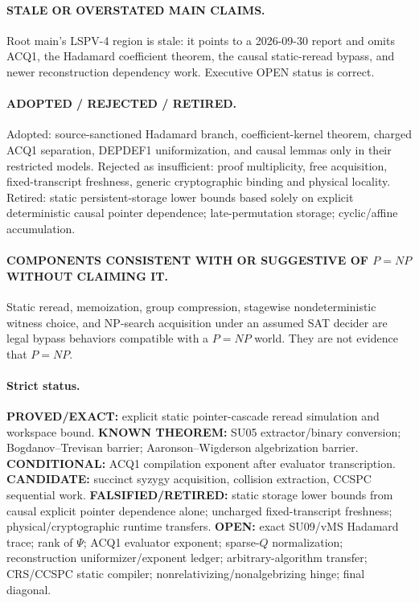 \documentclass[11pt]{article}
\begin{document}
\paragraph{STALE OR OVERSTATED MAIN CLAIMS.} Root main's LSPV-4 region is stale: it points to a 2026-09-30 report and omits ACQ1, the Hadamard coefficient theorem, the causal static-reread bypass, and newer reconstruction dependency work. Executive OPEN status is correct.

\paragraph{ADOPTED / REJECTED / RETIRED.} Adopted: source-sanctioned Hadamard branch, coefficient-kernel theorem, charged ACQ1 separation, DEPDEF1 uniformization, and causal lemmas only in their restricted models. Rejected as insufficient: proof multiplicity, free acquisition, fixed-transcript freshness, generic cryptographic binding and physical locality. Retired: static persistent-storage lower bounds based solely on explicit deterministic causal pointer dependence; late-permutation storage; cyclic/affine accumulation.

\paragraph{COMPONENTS CONSISTENT WITH OR SUGGESTIVE OF $P=NP$ WITHOUT CLAIMING IT.} Static reread, memoization, group compression, stagewise nondeterministic witness choice, and NP-search acquisition under an assumed SAT decider are legal bypass behaviors compatible with a $P=NP$ world. They are not evidence that $P=NP$.

\paragraph{Strict status.} \textbf{PROVED/EXACT:} explicit static pointer-cascade reread simulation and workspace bound. \textbf{KNOWN THEOREM:} SU05 extractor/binary conversion; Bogdanov--Trevisan barrier; Aaronson--Wigderson algebrization barrier. \textbf{CONDITIONAL:} ACQ1 compilation exponent after evaluator transcription. \textbf{CANDIDATE:} succinct syzygy acquisition, collision extraction, CCSPC sequential work. \textbf{FALSIFIED/RETIRED:} static storage lower bounds from causal explicit pointer dependence alone; uncharged fixed-transcript freshness; physical/cryptographic runtime transfers. \textbf{OPEN:} exact SU09/vMS Hadamard trace; rank of $\Psi$; ACQ1 evaluator exponent; sparse-$Q$ normalization; reconstruction uniformizer/exponent ledger; arbitrary-algorithm transfer; CRS/CCSPC static compiler; nonrelativizing/nonalgebrizing hinge; final diagonal.
\end{document}
